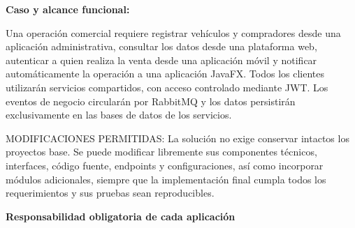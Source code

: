 \documentclass[11pt,a4paper]{article}
\renewcommand{\_}{\oldunderscore\allowbreak}
\begin{document}
\vspace{0.2cm}

\noindent\textbf{Caso y alcance funcional:}

\noindent Una operación comercial requiere registrar vehículos y compradores desde una aplicación administrativa, consultar los datos desde una plataforma web, autenticar a quien realiza la venta desde una aplicación móvil y notificar automáticamente la operación a una aplicación JavaFX. Todos los clientes utilizarán servicios compartidos, con acceso controlado mediante JWT. Los eventos de negocio circularán por RabbitMQ y los datos persistirán exclusivamente en las bases de datos de los servicios.

\noindent MODIFICACIONES PERMITIDAS: La solución no exige conservar intactos los proyectos base. Se puede modificar libremente sus componentes técnicos, interfaces, código fuente, endpoints y configuraciones, así como incorporar módulos adicionales, siempre que la implementación final cumpla todos los requerimientos y sus pruebas sean reproducibles.

\vspace{0.2cm}

\noindent\textbf{Responsabilidad obligatoria de cada aplicación}

\vspace{0.1cm}
\end{document}
